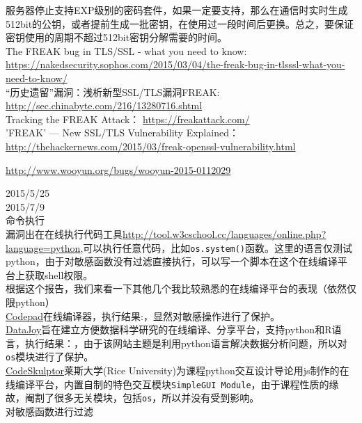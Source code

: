 \documentclass{leptc}
\begin{document}
     服务器停止支持EXP级别的密码套件，如果一定要支持，那么在通信时实时生成512bit的公钥，或者提前生成一批密钥，在使用过一段时间后更换。总之，要保证密钥使用的周期不超过512bit密钥分解需要的时间。\\
      The FREAK bug in TLS/SSL - what you need to know: \url{https://nakedsecurity.sophos.com/2015/03/04/the-freak-bug-in-tlsssl-what-you-need-to-know/} \\
     “历史遗留”漏洞：浅析新型SSL/TLS漏洞FREAK: \url{http://sec.chinabyte.com/216/13280716.shtml}\\
     Tracking the FREAK Attack： \url{https://freakattack.com/}  \\
     'FREAK' — New SSL/TLS Vulnerability Explained：\url{http://thehackernews.com/2015/03/freak-openssl-vulnerability.html}\\
    
    \begin{center}
    	\url{http://www.wooyun.org/bugs/wooyun-2015-0112029}
    \end{center}
     2015/5/25 \\
     2015/7/9 \\
     命令执行\\
     漏洞出在在线执行代码工具\url{http://tool.w3cschool.cc/languages/online.php?language=python},可以执行任意代码，比如\texttt{os.system()}函数。这里的语言仅测试python，由于对敏感函数没有过滤直接执行，可以写一个脚本在这个在线编译平台上获取shell权限。\\
     根据这个报告，我们来看一下其他几个我比较熟悉的在线编译平台的表现（依然仅限python）\\
     \href{http://codepad.org/8wOAh1mZ}{Codepad}在线编译器，执行结果:，显然对敏感操作进行了保护。\\
     \href{https://www.getdatajoy.com/}{DataJoy}旨在建立方便数据科学研究的在线编译、分享平台，支持python和R语言，执行结果：，由于该网站主题是利用python语言解决数据分析问题，所以对\texttt{os}模块进行了保护。 \\
     \href{http://www.codeskulptor.org/#user40_5ruLoi0n0D_0.py}{CodeSkulptor}莱斯大学(Rice University)为课程python交互设计导论用js制作的在线编译平台，内置自制的特色交互模块\texttt{SimpleGUI Module}，由于课程性质的缘故，阉割了很多无关模块，包括\texttt{os}，所以并没有受到影响。\\
     对敏感函数进行过滤 \\
    
\end{document}

